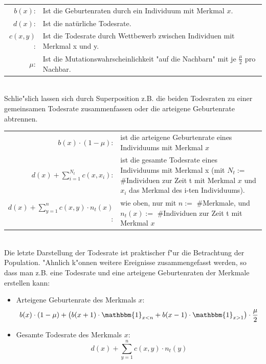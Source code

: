 \documentclass[11pt, a4paper, german]{article}
\begin{document}
	\begin{tabular}{r p{26em}}
		$ b(x) $: & Ist die Geburtenraten durch ein Individuum mit Merkmal $ x $.\\
		$ d(x) $: & Ist die natürliche Todesrate.\\
		$ c(x, y) $: & Ist die Todesrate durch Wettbewerb zwischen Individuen mit Merkmal x und y.\\
		$ \mu $: & Ist die Mutationswahrscheinlichkeit "{}auf die Nachbarn"{} mit je $ \frac{\mu}{2} $ pro Nachbar. \\
	\end{tabular}\\

	Schlie"slich lassen sich durch Superposition z.B. die beiden Todesraten zu einer gemeinsamen Todesrate zusammenfassen oder die arteigene Geburtenrate abtrennen.\\
	
	\begin{tabular}{ r p{18em} }
		$ b(x) \cdot (1 - \mu) $: & ist die arteigene Geburtenrate eines Individuums mit Merkmal $ x $\\
		$ d(x) + \sum_{i=1}^{N_t} c(x, x_i) $: & ist die gesamte Todesrate eines Individuums mit Merkmal x (mit $ N_t := $ \#Individuen zur Zeit t mit Merkmal $ x $ und $ x_i $ das Merkmal des i-ten Individuums).\\
		$ d(x) + \sum_{y=1}^{n} c(x,y) \cdot n_t(x) $: & wie oben, nur mit $ n := $ \#Merkmale, und $ n_t(x) :=$ \#Individuen zur Zeit t mit Merkmal $ x $
	\end{tabular}\\
	
	Die letzte Darstellung der Todesrate ist praktischer f"ur die Betrachtung der Population. "Ahnlich k"onnen weitere Ereignisse zusammengefasst werden, so dass man z.B. eine Todesrate und eine arteigene Geburtenraten der Merkmale erstellen kann:

	\begin{itemize}
	 	\item Arteigene Geburtenrate des Merkmals $ x $: 
	 	\[ b(x) \cdot (1 - \mu) + \left( b(x+1) \cdot \mathbbm{1}_{x<n} + b(x-1) \cdot \mathbbm{1}_{x>1} \right) \cdot \frac{\mu}{2} \] 
	 	\item Gesamte Todesrate des Merkmals $ x $: 
	 	\[ d(x) + \sum_{y=1}^{n} c(x,y) \cdot n_t(y) \]
	\end{itemize}
	
\end{document}
